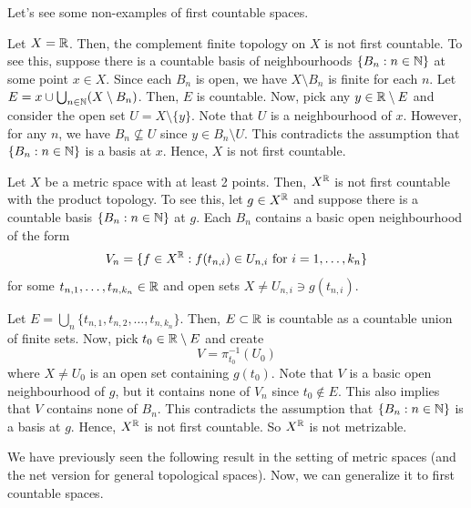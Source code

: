 Let's see some non-examples of first countable spaces.

\begin{example}
    Let $X=\mathbb{R}$. Then, the complement finite topology on $X$ is not first countable. To see this, suppose there is a countable basis of neighbourhoods $\{B_n:n\in\mathbb{N}\}$ at some point $x\in X$. Since each $B_n$ is open, we have $X\setminus B_n$ is finite for each $n$. Let $E=x\cup \bigcup_{n\in\mathbb{N}} (X\setminus B_n)$. Then, $E$ is countable. Now, pick any $y\in \mathbb{R}\setminus E$ and consider the open set $U=X\setminus \{y\}$. Note that $U$ is a neighbourhood of $x$. However, for any $n$, we have $B_n\not\subseteq U$ since $y\in B_n\setminus U$. This contradicts the assumption that $\{B_n:n\in\mathbb{N}\}$ is a basis at $x$. Hence, $X$ is not first countable.
\end{example}

\begin{example}
    Let $X$ be a metric space with at least 2 points. Then, $X^{\mathbb{R}}$ is not first countable with the product topology. To see this, let $g\in X^{\mathbb{R}}$ and suppose there is a countable basis $\{B_n:n\in\mathbb{N}\}$ at $g$. Each $B_n$ contains a basic open neighbourhood of the form
    $$V_n=\{f\in X^{\mathbb{R}}:f(t_{n,i})\in U_{n,i}\text{ for }i=1,\ldots,k_n\}$$
    for some $t_{n,1},\ldots,t_{n,k_n}\in\mathbb{R}$ and open sets $X\neq U_{n,i}\ni g(t_{n,i})$.

    Let $E=\bigcup_n\{t_{n,1},t_{n,2},\ldots, t_{n,k_n}\}$. Then, $E\subset \mathbb{R}$ is countable as a countable union of finite sets. Now, pick $t_0\in \mathbb{R}\setminus E$ and create
    $$V=\pi_{t_0}^{-1}(U_0)$$
    where $X\neq U_0$ is an open set containing $g(t_0)$. Note that $V$ is a basic open neighbourhood of $g$, but it contains none of $V_n$ since $t_0\notin E$. This also implies that $V$ contains none of $B_n$. This contradicts the assumption that $\{B_n:n\in\mathbb{N}\}$ is a basis at $g$. Hence, $X^{\mathbb{R}}$ is not first countable. So $X^{\mathbb{R}}$ is not metrizable.
\end{example}



We have previously seen the following result in the setting of metric spaces (and the net version for general topological spaces). Now, we can generalize it to first countable spaces. 

